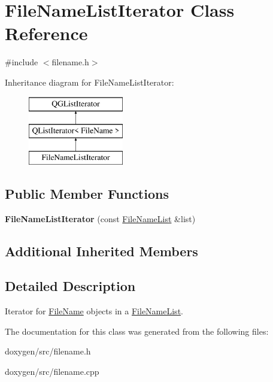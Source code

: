 \hypertarget{class_file_name_list_iterator}{}\section{File\+Name\+List\+Iterator Class Reference}
\label{class_file_name_list_iterator}


{\ttfamily \#include $<$filename.\+h$>$}

Inheritance diagram for File\+Name\+List\+Iterator\+:\begin{figure}[H]
\begin{center}
\leavevmode
\includegraphics[height=3.000000cm]{class_file_name_list_iterator}
\end{center}
\end{figure}
\subsection*{Public Member Functions}
\begin{DoxyCompactItemize}
\item 
\mbox{\label{class_file_name_list_iterator_a3671d429b0fc2b8501c3a294f328fba5}} 
{\bfseries File\+Name\+List\+Iterator} (const \mbox{\hyperlink{class_file_name_list}{File\+Name\+List}} \&list)
\end{DoxyCompactItemize}
\subsection*{Additional Inherited Members}


\subsection{Detailed Description}
Iterator for \mbox{\hyperlink{class_file_name}{File\+Name}} objects in a \mbox{\hyperlink{class_file_name_list}{File\+Name\+List}}. 

The documentation for this class was generated from the following files\+:\begin{DoxyCompactItemize}
\item 
doxygen/src/filename.\+h\item 
doxygen/src/filename.\+cpp\end{DoxyCompactItemize}
